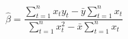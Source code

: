 \[\hat{\beta} = \frac{\sum_{t=1}^n x_t y_t - \bar{y} \sum_{t=1}^n x_t}{\sum_{t=1}^n x^2_t - \bar{x}\sum_{t=1}^n x_t}\]

